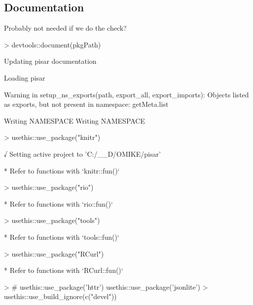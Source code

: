 \documentclass[a4paper,12pt]{article}\usepackage[]{graphicx}\usepackage[]{color}
\begin{document}
\subsection{Documentation}
Probably not needed if we do the check?
\begin{Schunk}
\begin{Sinput}
> devtools::document(pkgPath)
\end{Sinput}
\begin{Soutput}
Updating pisar documentation
\end{Soutput}
\begin{Soutput}
Loading pisar
\end{Soutput}
\begin{Soutput}
Warning in setup_ns_exports(path, export_all, export_imports): Objects listed as exports, but not present in namespace: getMeta.list
\end{Soutput}
\begin{Soutput}
Writing NAMESPACE
Writing NAMESPACE
\end{Soutput}
\begin{Sinput}
> usethis::use_package("knitr")
\end{Sinput}
\begin{Soutput}
√ Setting active project to 'C:/__D/OMIKE/pisar'
\end{Soutput}
\begin{Soutput}
Warning in if (delta < 0) {: the condition has length > 1 and only the first element will be used
\end{Soutput}
\begin{Soutput}
Warning in if (delta > 0) {: the condition has length > 1 and only the first element will be used
\end{Soutput}
\begin{Soutput}
* Refer to functions with `knitr::fun()`
\end{Soutput}
\begin{Sinput}
> usethis::use_package("rio")
\end{Sinput}
\begin{Soutput}
* Refer to functions with `rio::fun()`
\end{Soutput}
\begin{Sinput}
> usethis::use_package("tools")
\end{Sinput}
\begin{Soutput}
* Refer to functions with `tools::fun()`
\end{Soutput}
\begin{Sinput}
> usethis::use_package("RCurl")
\end{Sinput}
\begin{Soutput}
* Refer to functions with `RCurl::fun()`
\end{Soutput}
\begin{Sinput}
> # usethis::use_package('httr') usethis::use_package('jsonlite')
> usethis::use_build_ignore(c("devel"))
\end{Sinput}
\end{Schunk}
\clearpage
\end{document}
